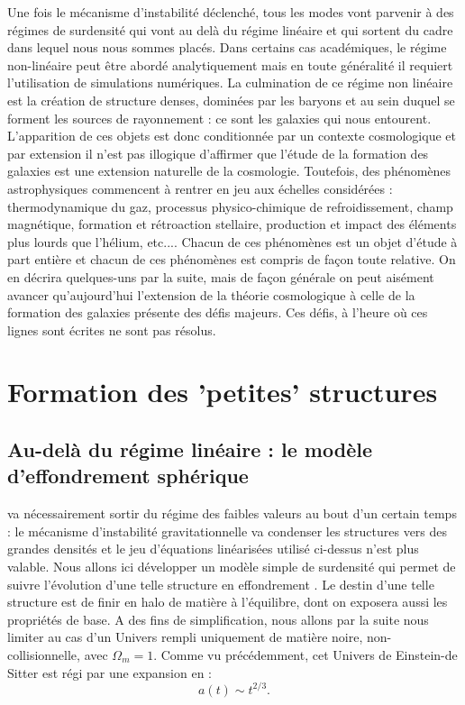 Une fois le mécanisme d'instabilité déclenché, tous les modes vont parvenir à des régimes de surdensité qui vont au delà du régime linéaire et qui sortent du cadre dans lequel nous nous sommes placés. Dans certains cas académiques, le régime non-linéaire peut être abordé analytiquement mais en toute généralité il requiert l'utilisation de simulations numériques. La culmination de ce régime non linéaire est la création de structure denses, dominées par les baryons et au sein duquel se forment les sources de rayonnement : ce sont les galaxies qui nous entourent. L'apparition de ces objets est donc conditionnée par un contexte cosmologique et par extension il n'est pas illogique d'affirmer que l'étude de la formation des galaxies est une extension naturelle de la cosmologie. Toutefois, des phénomènes astrophysiques commencent à rentrer en jeu aux échelles considérées : thermodynamique du gaz, processus physico-chimique de refroidissement, champ magnétique, formation et rétroaction stellaire, production et impact des éléments plus lourds que l'hélium, etc.... Chacun de ces phénomènes est un objet d'étude à part entière et chacun de ces phénomènes est compris de façon toute relative. On en décrira quelques-uns par la suite, mais de façon générale on peut aisément avancer qu'aujourd'hui l'extension de la théorie cosmologique à celle de la formation des galaxies présente des défis majeurs. Ces défis, à l'heure où ces lignes sont écrites ne sont pas résolus.

\chapter{Formation des 'petites' structures}

\section{Au-delà du régime linéaire : le modèle d'effondrement sphérique}

 va nécessairement sortir du régime des faibles valeurs au bout d'un certain temps : le mécanisme d'instabilité gravitationnelle va condenser les structures vers des grandes densités et le jeu d'équations linéarisées utilisé ci-dessus n'est plus valable. Nous allons ici développer un modèle simple de surdensité qui permet de suivre l'évolution d'une telle structure en effondrement . Le destin d'une telle structure est de finir en halo de matière à l'équilibre, dont on exposera aussi les propriétés de base. A des fins de simplification, nous allons par la suite nous limiter au cas d'un Univers rempli uniquement de matière noire, non-collisionnelle, avec $\Omega_m=1$. Comme vu précédemment, cet Univers de Einstein-de Sitter est régi par une expansion en :
\begin{equation}
a(t) \sim t^{2/3}.
\end{equation}

